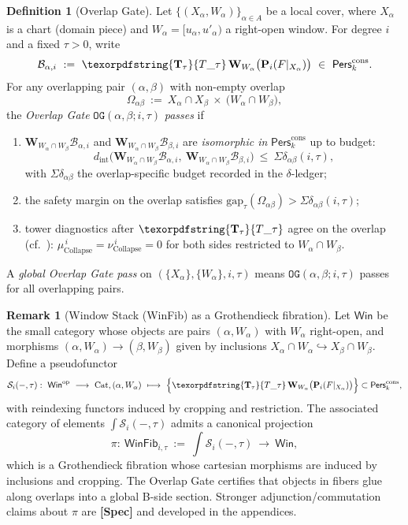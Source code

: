 \documentclass[11pt]{article}
\numberwithin{equation}{section}
\theoremstyle{plain}
\theoremstyle{definition}
\theoremstyle{remark}
\newcommand{\Pers}{\mathsf{Pers}}
\theoremstyle{plain}
\theoremstyle{definition}
\numberwithin{equation}{section}
\theoremstyle{definition}
\newtheorem{definition}[theorem]{Definition}
\newtheorem{remark}[theorem]{Remark}
\DeclareRobustCommand{\Ttau}{\texorpdfstring{\ensuremath{\mathbf{T}_{\tau}}}{T\_\tau}}
\numberwithin{equation}{section}
\theoremstyle{plain}
\theoremstyle{definition}
\theoremstyle{remark}
\newcommand{\Perscons}{\Pers^{\mathrm{cons}}_k}
\newcommand{\Crop}{\mathbf{W}}
\newcommand{\intdist}{d_{\mathrm{int}}}
\providecommand{\Tfun}[1]{\mathbf{T}_{#1}}
\providecommand{\Ttau}{\Tfun{\tau}}
\providecommand{\intdist}{d_{\mathrm{int}}}  %
\providecommand{\n}{\unskip\space}
\begin{document}
\begin{definition}[Overlap Gate]\label{def:overlap-gate}
Let \(\{(X_\alpha,W_\alpha)\}_{\alpha\in A}\) be a local cover, where \(X_\alpha\) is a chart (domain piece) and \(W_\alpha=[u_\alpha,u'_\alpha)\) a right-open window. For degree \(i\) and a fixed \(\tau>0\), write
\[
\mathcal{B}_{\alpha,i}\ :=\ \Ttau\,\Crop_{W_\alpha}\big(\mathbf{P}_i(F|_{X_\alpha})\big)\ \in\ \Perscons.
\]
For any overlapping pair \((\alpha,\beta)\) with non-empty overlap
\[
\Omega_{\alpha\beta}\ :=\ X_\alpha\cap X_\beta\ \times\ \bigl(W_\alpha\cap W_\beta\bigr),
\]
the \emph{Overlap Gate} \(\texttt{OG}(\alpha,\beta;i,\tau)\) \emph{passes} if
\begin{enumerate}[label=(\roman*),leftmargin=1.25em]
\item \(\Crop_{W_\alpha\cap W_\beta}\mathcal{B}_{\alpha,i}\) and \(\Crop_{W_\alpha\cap W_\beta}\mathcal{B}_{\beta,i}\) are \emph{isomorphic in} \(\Perscons\) up to budget:
\[
\intdist\!\Big(\Crop_{W_\alpha\cap W_\beta}\mathcal{B}_{\alpha,i},\ \Crop_{W_\alpha\cap W_\beta}\mathcal{B}_{\beta,i}\Big)\ \le\ \Sigma\delta_{\alpha\beta}(i,\tau),
\]
with \(\Sigma\delta_{\alpha\beta}\) the overlap-specific budget recorded in the \(\delta\)-ledger;
\item the safety margin on the overlap satisfies \(\mathrm{gap}_\tau(\Omega_{\alpha\beta})>\Sigma\delta_{\alpha\beta}(i,\tau)\);
\item tower diagnostics after \(\Ttau\) agree on the overlap (cf.\ ): \(\mu_{\mathrm{Collapse}}^{\,i}=\nu_{\mathrm{Collapse}}^{\,i}=0\) for both sides restricted to \(W_\alpha\cap W_\beta\).
\end{enumerate}
A \emph{global Overlap Gate pass} on \((\{X_\alpha\},\{W_\alpha\},i,\tau)\) means \(\texttt{OG}(\alpha,\beta;i,\tau)\) passes for all overlapping pairs.
\end{definition}

\begin{remark}[Window Stack (WinFib) as a Grothendieck fibration]\label{rk:winfib}
Let \(\mathsf{Win}\) be the small category whose objects are pairs \((\alpha,W_\alpha)\) with \(W_\alpha\) right-open, and morphisms \((\alpha,W_\alpha)\to(\beta,W_\beta)\) given by inclusions \(X_\alpha\cap W_\alpha\hookrightarrow X_\beta\cap W_\beta\). Define a pseudofunctor
\[
\mathcal{S}_i(-,\tau):\ \mathsf{Win}^{\mathrm{op}}\ \longrightarrow\ \mathrm{Cat},\qquad\n(\alpha,W_\alpha)\ \longmapsto\ \Big\{\Ttau\,\Crop_{W_\alpha}\big(\mathbf{P}_i(F|_{X_\alpha})\big)\Big\}\subset\Perscons,
\]
with reindexing functors induced by cropping and restriction. The associated category of elements \(\int \mathcal{S}_i(-,\tau)\) admits a canonical projection
\[
\pi:\ \mathsf{WinFib}_{i,\tau}\ :=\ \int \mathcal{S}_i(-,\tau)\ \longrightarrow\ \mathsf{Win},
\]
which is a Grothendieck fibration whose cartesian morphisms are induced by inclusions and cropping. The Overlap Gate certifies that objects in fibers glue along overlaps into a global B-side section. Stronger adjunction/commutation claims about \(\pi\) are \textbf{[Spec]} and developed in the appendices.
\end{remark}
\end{document}
